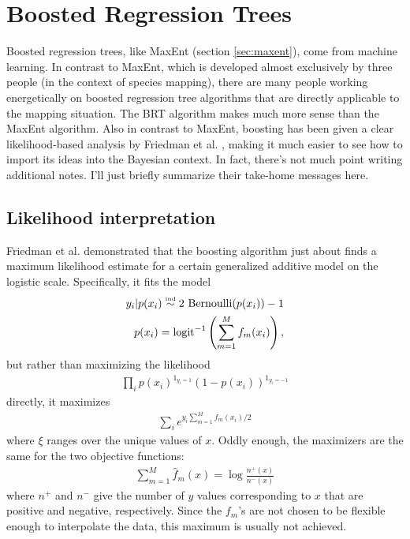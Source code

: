 
\section{Boosted Regression Trees} 
\label{sec:brt}

Boosted regression trees, like MaxEnt (section \ref{sec:maxent}), come from machine learning. In contrast to MaxEnt, which is developed almost exclusively by three people (in the context of species mapping), there are many people working energetically on boosted regression tree algorithms that are directly applicable to the mapping situation. The BRT algorithm makes much more sense than the MaxEnt algorithm. Also in contrast to MaxEnt, boosting has been given a clear likelihood-based analysis by Friedman et al. \cite{Friedman:2000p11413}, making it much easier to see how to import its ideas into the Bayesian context. In fact, there's not much point writing additional notes. I'll just briefly summarize their take-home messages here.

\subsection{Likelihood interpretation}
\label{sec:likelihood-interp} 
Friedman et al. demonstrated that the boosting algorithm just about finds a maximum likelihood estimate for a certain generalized additive model on the logistic scale. Specifically, it fits the model
\begin{eqnarray*}
    y_i|p(x_i) \stackrel{\textup{\tiny ind}}{\sim} 2\ \textup{Bernoulli}(p(x_i))-1 \\
    p(x_i) = \textup{logit}^{-1}\left(\sum_{m=1}^M f_m(x_i)\right),
\end{eqnarray*}
but rather than maximizing the likelihood
\begin{eqnarray*}
    \prod_i p(x_i)^{1_{y_i=1}}(1-p(x_i))^{1_{y_i=-1}}
\end{eqnarray*}
directly, it maximizes 
\begin{eqnarray*}
    \sum_ie^{y_i\sum_{m=1}^Mf_m(x_i)/2}
\end{eqnarray*}
where $\xi$ ranges over the unique values of $x$. Oddly enough, the maximizers are the same for the two objective functions:
\begin{eqnarray*}
    \sum_{m=1}^M\hat f_m(x) = \log \frac{n^+(x)}{n^-(x)}
\end{eqnarray*}
where $n^+$ and $n^-$ give the number of $y$ values corresponding to $x$ that are positive and negative, respectively. Since the $f_m$'s are not chosen to be flexible enough to interpolate the data, this maximum is usually not achieved.

